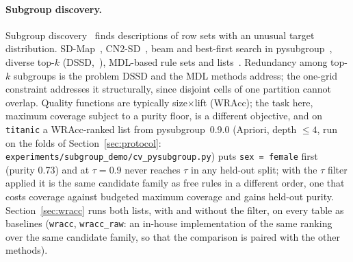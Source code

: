 \documentclass[11pt]{article}
\begin{document}
\paragraph{Subgroup discovery.} Subgroup discovery~\citep{klosgen1996,wrobel1997,herrera2011,atzmueller2015} finds descriptions of row sets with an unusual target distribution. SD-Map~\citep{atzmueller2006}, CN2-SD~\citep{lavrac2004}, beam and best-first search in pysubgroup~\citep{lemmerich2018}, diverse top-$k$ (DSSD,~\citealp{vanleeuwen2012}), MDL-based rule sets and lists~\citep{fischer2019,proenca2022}. Redundancy among top-$k$ subgroups is the problem DSSD and the MDL methods address; the one-grid constraint addresses it structurally, since disjoint cells of one partition cannot overlap. Quality functions are typically size$\times$lift (WRAcc); the task here, maximum coverage subject to a purity floor, is a different objective, and on \texttt{titanic} a WRAcc-ranked list from pysubgroup~0.9.0 (Apriori, depth $\le4$, run on the folds of Section~\ref{sec:protocol}: \texttt{experiments/subgroup\_demo/cv\_pysubgroup.py}) puts \texttt{sex = female} first (purity 0.73) and at $\tau=0.9$ never reaches $\tau$ in any held-out split; with the $\tau$ filter applied it is the same candidate family as free rules in a different order, one that costs coverage against budgeted maximum coverage and gains held-out purity. Section~\ref{sec:wracc} runs both lists, with and without the filter, on every table as baselines (\texttt{wracc}, \texttt{wracc\_raw}: an in-house implementation of the same ranking over the same candidate family, so that the comparison is paired with the other methods).
\end{document}
